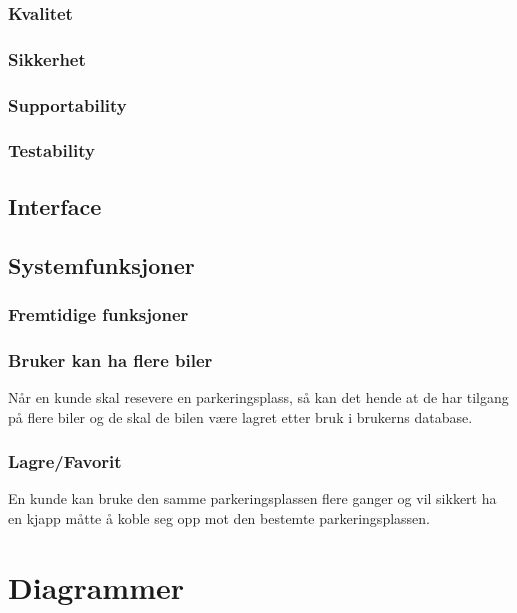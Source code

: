 \documentclass[12pt]{article}
\begin{document}
        \subsubsection{Kvalitet}


        \subsubsection{Sikkerhet}


        \subsubsection{Supportability}


        \subsubsection{Testability}
        

    \subsection{Interface}

    \subsection{Systemfunksjoner}

        \subsubsection{Fremtidige funksjoner}

            \subsubsection{Bruker kan ha flere biler}
            Når en kunde skal resevere en parkeringsplass, så kan det hende at de har tilgang på flere biler og de skal de bilen være lagret etter bruk i brukerns database.

            \subsubsection{Lagre/Favorit}
            En kunde kan bruke den samme parkeringsplassen flere ganger og vil sikkert ha en kjapp måtte å koble seg opp mot den bestemte parkeringsplassen.

\section{Diagrammer}
\end{document}
